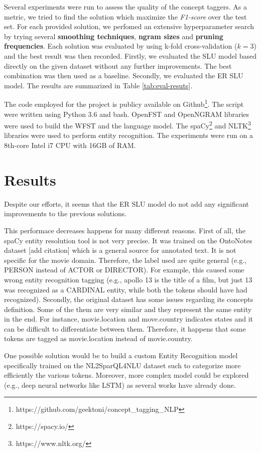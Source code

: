 \documentclass[11pt,a4paper]{article}
\begin{document}
Several experiments were run to assess the quality of 
the concept taggers. As a metric, we tried to find the solution which maximize the \textit{F1-score} over the test set. For each provided solution, we perfomed an extensive hyperparameter search by trying several \textbf{smoothing techniques}, \textbf{ngram sizes} and \textbf{pruning frequencies}. Each solution was evaluated by using k-fold cross-validation ($k=3$) and the best result was then recorded. Firstly, we evaluated the SLU model based directly on the given dataset without any further improvements. The best combination was then used as a baseline. Secondly, we evaluated the ER SLU model. The results are summarized in Table \ref{tab:eval-resuts}.

The code employed for the project is publicy available on Github\footnote{https://github.com/geektoni/concept\_tagging\_NLP}. The script were written using Python 3.6 and bash. OpenFST \cite{openfst} and OpenNGRAM \cite{opengrm} libraries were used to build the WFST and the language model. The spaCy\footnote{https://spacy.io/} and NLTK\footnote{https://www.nltk.org/} libraries were used to perform entity recognition.
The experiments were run on a 8th-core Intel i7 CPU with 16GB of RAM. 



\section{Results}

Despite our efforts, it seems that the ER SLU model do not add any significant improvements to the previous solutions.

This performace decreases happens for many different reasons. First of all, the spaCy entity resolution tool is not very precise. It was trained on the OntoNotes dataset [add citation] which is a general source for annotated text. It is not specific for the movie domain. Therefore, the label used are quite general (e.g., PERSON instead of ACTOR or DIRECTOR). For example, this caused some wrong entity recognition tagging (e.g., apollo 13 is the title of a film, but just 13 was recognized as a CARDINAL entity, while both the tokens should have had recognized).
Secondly, the original dataset has some issues regarding its concepts definition. Some of the them are very similar and they represent the same entity in the end. For instance, movie.location and move.country indicates states and it can be difficult to differentiate between them. Therefore, it happens that some tokens are tagged as movie.location instead of movie.country.  

One possible solution would be to build a custom Entity Recognition model specifically trained on the NL2SparQL4NLU dataset such to categorize more efficiently the various tokens. Moreover, more complex model could be explored (e.g., deep neural networks like LSTM) as several works have already done.



\end{document}
